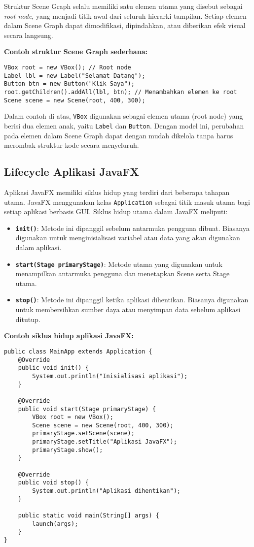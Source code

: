 Struktur Scene Graph selalu memiliki satu elemen utama yang disebut sebagai \textit{root node}, yang menjadi titik awal dari seluruh hierarki tampilan. Setiap elemen dalam Scene Graph dapat dimodifikasi, dipindahkan, atau diberikan efek visual secara langsung.

\textbf{Contoh struktur Scene Graph sederhana:}
\begin{lstlisting}[style=JavaStyle, caption=Contoh Scene Graph dalam JavaFX]
VBox root = new VBox(); // Root node
Label lbl = new Label("Selamat Datang");
Button btn = new Button("Klik Saya");
root.getChildren().addAll(lbl, btn); // Menambahkan elemen ke root
Scene scene = new Scene(root, 400, 300);
\end{lstlisting}

Dalam contoh di atas, \texttt{VBox} digunakan sebagai elemen utama (root node) yang berisi dua elemen anak, yaitu \texttt{Label} dan \texttt{Button}. Dengan model ini, perubahan pada elemen dalam Scene Graph dapat dengan mudah dikelola tanpa harus merombak struktur kode secara menyeluruh.

\subsection{Lifecycle Aplikasi JavaFX}

Aplikasi JavaFX memiliki siklus hidup yang terdiri dari beberapa tahapan utama. JavaFX menggunakan kelas \texttt{Application} sebagai titik masuk utama bagi setiap aplikasi berbasis GUI. Siklus hidup utama dalam JavaFX meliputi:

\begin{itemize}
\item \textbf{\texttt{init()}}: Metode ini dipanggil sebelum antarmuka pengguna dibuat. Biasanya digunakan untuk menginisialisasi variabel atau data yang akan digunakan dalam aplikasi.
\item \textbf{\texttt{start(Stage primaryStage)}}: Metode utama yang digunakan untuk menampilkan antarmuka pengguna dan menetapkan Scene serta Stage utama.
\item \textbf{\texttt{stop()}}: Metode ini dipanggil ketika aplikasi dihentikan. Biasanya digunakan untuk membersihkan sumber daya atau menyimpan data sebelum aplikasi ditutup.
\end{itemize}

\textbf{Contoh siklus hidup aplikasi JavaFX:}
\begin{lstlisting}[style=JavaStyle, caption=Contoh siklus hidup JavaFX]
public class MainApp extends Application {
	@Override
	public void init() {
		System.out.println("Inisialisasi aplikasi");
	}
	
	@Override
	public void start(Stage primaryStage) {
		VBox root = new VBox();
		Scene scene = new Scene(root, 400, 300);
		primaryStage.setScene(scene);
		primaryStage.setTitle("Aplikasi JavaFX");
		primaryStage.show();
	}
	
	@Override
	public void stop() {
		System.out.println("Aplikasi dihentikan");
	}
	
	public static void main(String[] args) {
		launch(args);
	}
}
\end{lstlisting}

